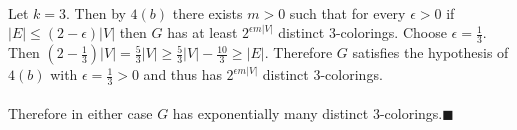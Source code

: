 \documentclass[letterpaper,12pt,oneside,onecolumn]{report}
\begin{document}
\paragraph{}
Let $k = 3$. Then by $4(b)$ there exists $m > 0$ such that for every $\epsilon > 0$ if $|E| \leq (2 - \epsilon)|V|$ then $G$ has at least $2^{\epsilon m |V|}$ distinct $3$-colorings. Choose $\epsilon = \frac{1}{3}$. Then $(2 - \frac{1}{3})|V| = \frac{5}{3}|V| \geq \frac{5}{3}|V| - \frac{10}{3} \geq |E|$. Therefore $G$ satisfies the hypothesis of $4(b)$ with $\epsilon = \frac{1}{3} > 0$ and thus has $2^{\epsilon m |V|}$ distinct $3$-colorings.
\paragraph{}
Therefore in either case $G$ has exponentially many distinct $3$-colorings.$\blacksquare$
\end{document}

